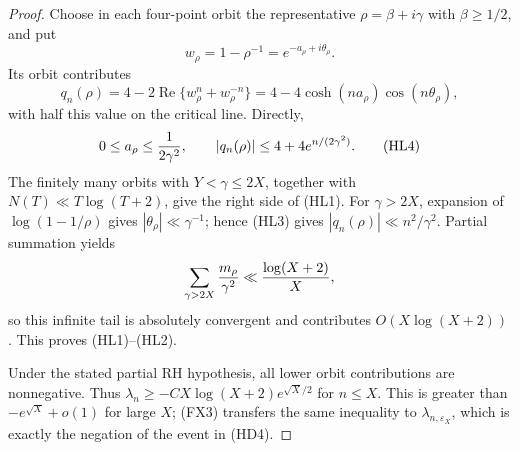 \documentclass[11pt]{amsart}
\theoremstyle{definition}
\theoremstyle{remark}
\theoremstyle{definition}
\renewcommand{\Re}{\operatorname{Re}}
\begin{document}
\begin{proof}
Choose in each four-point orbit the representative
$\rho=\beta+i\gamma$ with $\beta\ge1/2$, and put
\[
 w_\rho=1-\rho^{-1}=e^{-a_\rho+i\theta_\rho}.
\]
Its orbit contributes
\[
 q_n(\rho)=4-2\Re\{w_\rho^n+w_\rho^{-n}\}
 =4-4\cosh(na_\rho)\cos(n\theta_\rho),                  \tag{HL3}
\]
with half this value on the critical line.  Directly,
\[
 0\le a_\rho\le{1\over2\gamma^2},
 \qquad |q_n(\rho)|\le4+4e^{n/(2\gamma^2)}.              \tag{HL4}
\]
The finitely many orbits with $Y<\gamma\le2X$, together with
$N(T)\ll T\log(T+2)$, give the right side of (HL1).  For
$\gamma>2X$, expansion of $\log(1-1/\rho)$ gives
$|\theta_\rho|\ll\gamma^{-1}$; hence (HL3) gives
$|q_n(\rho)|\ll n^2/\gamma^2$.  Partial summation yields
\[
 \sum_{\gamma>2X}{m_\rho\over\gamma^2}
 \ll{\log(X+2)\over X},
\]
so this infinite tail is absolutely convergent and contributes
$O(X\log(X+2))$.  This proves (HL1)--(HL2).

Under the stated partial RH hypothesis, all lower orbit contributions are
nonnegative.  Thus
$\lambda_n\ge-CX\log(X+2)e^{\sqrt X/2}$ for $n\le X$.
This is greater than $-e^{\sqrt X}+o(1)$ for large $X$; (FX3) transfers the
same inequality to $\lambda_{n,\varepsilon_X}$, which is exactly the
negation of the event in (HD4).
\end{proof}
\end{document}

